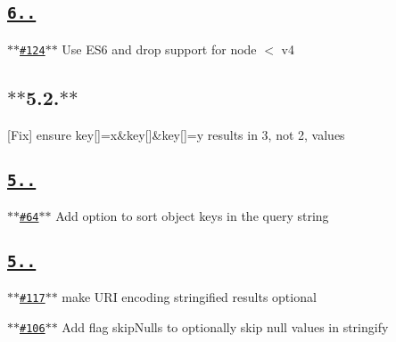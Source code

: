 \subsection*{\href{https://github.com/ljharb/qs/issues?milestone=31&state=closed}{\tt {\bfseries 6..}}}


\begin{DoxyItemize}
\item \href{https://github.com/ljharb/qs/issues/124}{\tt $\ast$$\ast$\#124$\ast$$\ast$} Use E\+S6 and drop support for node $<$ v4
\end{DoxyItemize}

\subsection*{$\ast$$\ast$5.2.$\ast$$\ast$}


\begin{DoxyItemize}
\item \mbox{[}Fix\mbox{]} ensure {\ttfamily key\mbox{[}\mbox{]}=x\&key\mbox{[}\mbox{]}\&key\mbox{[}\mbox{]}=y} results in 3, not 2, values
\end{DoxyItemize}

\subsection*{\href{https://github.com/ljharb/qs/issues?milestone=30&state=closed}{\tt {\bfseries 5..}}}


\begin{DoxyItemize}
\item \href{https://github.com/ljharb/qs/issues/64}{\tt $\ast$$\ast$\#64$\ast$$\ast$} Add option to sort object keys in the query string
\end{DoxyItemize}

\subsection*{\href{https://github.com/ljharb/qs/issues?milestone=29&state=closed}{\tt {\bfseries 5..}}}


\begin{DoxyItemize}
\item \href{https://github.com/ljharb/qs/issues/117}{\tt $\ast$$\ast$\#117$\ast$$\ast$} make U\+RI encoding stringified results optional
\item \href{https://github.com/ljharb/qs/issues/106}{\tt $\ast$$\ast$\#106$\ast$$\ast$} Add flag {\ttfamily skip\+Nulls} to optionally skip null values in stringify
\end{DoxyItemize}

